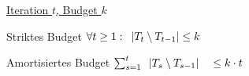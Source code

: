\begin{frame}
    \frametitle{\insertsubsection}
    \underline{Iteration $t$, Budget $k$}\\
    \vspace{1em}
    \begin{block}{Striktes Budget}
        \vspace{1em}
        $\forall t \geq 1:\hspace{0.5em}|T_t \setminus T_{t-1}| \leq k$
        \vspace{1em}
    \end{block}
    \vspace{1em}
    \begin{block}{Amortisiertes Budget}
        \vspace{1em}
        $ \sum_{s=1}^{t}\hspace{0.5em}|T_s \setminus T_{s-1}| \quad \leq k \cdot t$
        \vspace{1em}
    \end{block}
\end{frame}
